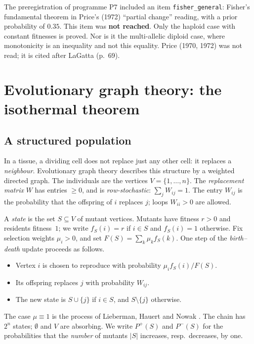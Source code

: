 \begin{warnbox}
The preregistration of programme P7 included an item \texttt{fisher\_general}: Fisher's fundamental theorem
in Price's (1972) ``partial change'' reading, with a prior probability of $0.35$. This
item was \textbf{not reached}. Only the haploid case with constant fitnesses is proved. Nor is it
the multi-allelic diploid case, where monotonicity is an inequality and not this equality. Price (1970,
1972) was not read; it is cited after LaGatta \cite{ch4:LaG} (p.~69).
\end{warnbox}

\section{Evolutionary graph theory: the isothermal theorem}\label{ch4:sec:graphes}

\subsection{A structured population}
In a tissue, a dividing cell does not replace just any other cell: it replaces a
\emph{neighbour}. Evolutionary graph theory describes this structure by a weighted directed graph. The
individuals are the vertices $V=\{1,\dots,n\}$. The \emph{replacement matrix} $W$ has entries $\ge0$, and is
\emph{row-stochastic}: $\sum_jW_{ij}=1$. The entry $W_{ij}$ is the probability that the offspring of
$i$ replaces $j$; loops $W_{ii}>0$ are allowed.

A \emph{state} is the set $S\subseteq V$ of mutant vertices. Mutants have fitness $r>0$ and
residents fitness~$1$; we write $f_S(i)=r$ if $i\in S$ and $f_S(i)=1$ otherwise. Fix
selection weights $\mu_i>0$, and set $F(S)=\sum_k\mu_kf_S(k)$. One step of the \emph{birth--death} update
proceeds as follows.
\begin{itemize}[itemsep=1pt]
\item Vertex $i$ is chosen to reproduce with probability $\mu_if_S(i)/F(S)$.
\item Its offspring replaces $j$ with probability $W_{ij}$.
\item The new state is $S\cup\{j\}$ if $i\in S$, and $S\setminus\{j\}$ otherwise.
\end{itemize}
The case $\mu\equiv1$ is the process of Lieberman, Hauert and Nowak \cite{ch4:LHN}. The chain has $2^n$ states; $\emptyset$
and $V$ are absorbing. We write $P^{+}(S)$ and $P^{-}(S)$ for the probabilities that the \emph{number} of mutants $|S|$
increases, resp.\ decreases, by one.

